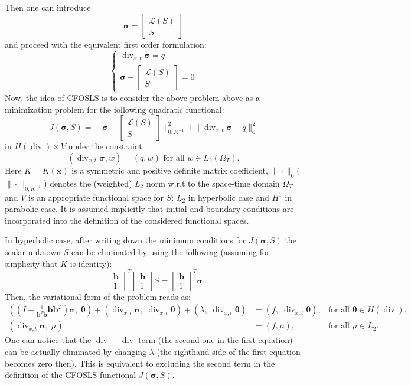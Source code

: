 \documentclass[12pt]{article}
\renewcommand{\div}{\operatorname{div}}
\def\bb{{\mathbf b}}
\def\btheta{{\boldsymbol \theta}}
\def\bsigma{{\boldsymbol \sigma}}
\begin{document}
Then one can introduce 
$$
\bsigma = \left[ \begin{array}{c} \mathcal{L}(S) \\ S \end{array} \right]
$$
and proceed with the equivalent first order formulation:
$$
\left\{
\begin{array}{c}
\operatorname{div}_{x,t} \bsigma = q \\
\bsigma - 
\left[ 
\begin{array}{c} \mathcal{L}(S) \\ S \end{array}
\right] = 0
\end{array}
\right.
$$
Now, the idea of CFOSLS \cite{CFOSLS} is to consider the above problem above as a minimization problem for the following quadratic functional:
$$
J(\bsigma,S) = \| \bsigma - \left[ \begin{array}{c} \mathcal{L}(S) \\ S \end{array} \right] \|^2_{0,K^{-1}} + \| \operatorname{\div}_{x,t} \bsigma - q \|^2_0
$$
in $H(\div) \times V$ under the constraint
$$
(\operatorname{div}_{x,t} \bsigma, w) = (q, w) \, \, \text{for all} \, \, w \in L_2(\Omega_T).
$$
Here $K = K(\mathbf{x})$ is a symmetric and positive definite matrix coefficient, $\| \cdot \|_0$($\| \cdot \|_{0,K^{-1}}$) denotes the (weighted) $L_2$ norm w.r.t to the space-time domain $\Omega_T$ and $V$ is an appropriate functional space for $S$: $L_2$ in hyperbolic case and $H^1$ in parabolic case. It is assumed implicitly that initial and boundary conditions are incorporated into the definition of the considered functional spaces.

In hyperbolic case, after writing down the minimum conditions for $J(\bsigma,S)$ the scalar unknown $S$  can be eliminated by using the following (assuming for simplicity that $K$ is identity):
$$
\left[ 
\begin{array}{c} \mathbf{b} \\ 1 \end{array}
\right]^T
\left[ 
\begin{array}{c} \mathbf{b} \\ 1 \end{array}
\right]
 S = \left[ 
\begin{array}{c} \mathbf{b} \\ 1 \end{array}
\right]^T \bsigma
$$
Then, the variational form of the problem reads as:
$$
\begin{array}{lll}
((I- \frac{1}{\bb^T\bb} \bb\bb^T) \bsigma,\;\btheta)+(\div_{x,t} \bsigma,\;\div_{x,t} \btheta)+(\lambda,\;\div_{x,t} \btheta)&= (f,\;\div_{x,t} \btheta),&\text{for all }\btheta \in H(\div),\\
(\div_{x,t} \bsigma,\;\mu)&= (f,\mu),&\text{for all }\mu \in L_2.
\end{array}
$$
One can notice that the $\div-\div$ term (the second one in the first equation) can be actually eliminated by changing $\lambda$ (the righthand side of the first equation becomes zero then). This is equivalent to excluding the second term in the definition of the CFOSLS functional $J(\bsigma,S)$.
\end{document}
